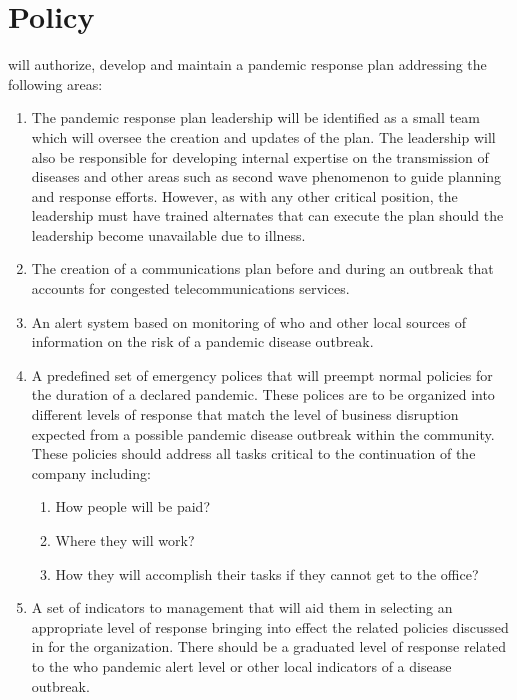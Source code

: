 \section{Policy}
\CompanyName{} will authorize, develop and maintain a pandemic response plan addressing the following areas:
\begin{enumerate}
\item 
The pandemic response plan leadership will be identified as a small team which will oversee the creation and updates of the plan.  
The leadership will also be responsible for developing internal expertise on the transmission of diseases and other areas such as second wave phenomenon to guide planning and response efforts.  
However, as with any other critical position, the leadership must have trained alternates that can execute the plan should the leadership become unavailable due to illness.
\item 
The creation of a communications plan before and during an outbreak that accounts for congested telecommunications services.
\item 
An alert system based on monitoring of \gls{who} and other local sources of information on the risk of a pandemic disease outbreak.
\item \label{G:PRPP:P:4}
A predefined set of emergency polices that will preempt normal \CompanyName{} policies for the duration of a declared pandemic.  
These polices are to be organized into different levels of response that match the level of business disruption expected from a possible pandemic disease outbreak within the community.  
These policies should address all tasks critical to the continuation of the company including:
\begin{enumerate}
\item 
How people will be paid?
\item 
Where they will work?
\item 
How they will accomplish their tasks if they cannot get to the office?
\end{enumerate}
\item
A set of indicators to management that will aid them in selecting an appropriate level of response bringing into effect the related policies discussed in  for the organization.  
There should be a graduated level of response related to the \gls{who} pandemic alert level or other local indicators of a disease outbreak.

\end{enumerate}
